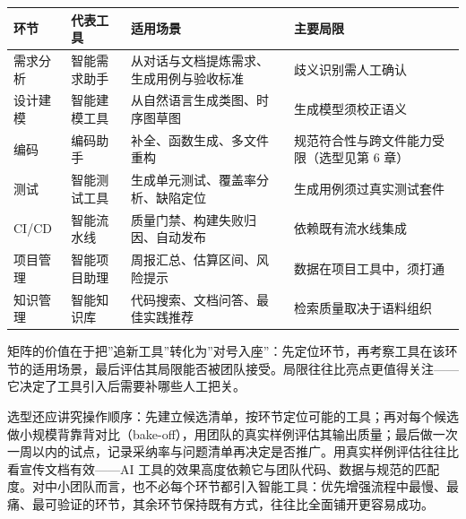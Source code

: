 \documentclass[
]{ctexbook}
\newcounter{none}
\begin{document}
{\def\LTcaptype{none} %
\begin{longtable}[]{@{}
  >{\raggedright\arraybackslash}p{}
  >{\raggedright\arraybackslash}p{}
  >{\raggedright\arraybackslash}p{}
  >{\raggedright\arraybackslash}p{}@{}}
\toprule\noalign{}
\begin{minipage}[b]{\linewidth}\raggedright
环节
\end{minipage} & \begin{minipage}[b]{\linewidth}\raggedright
代表工具
\end{minipage} & \begin{minipage}[b]{\linewidth}\raggedright
适用场景
\end{minipage} & \begin{minipage}[b]{\linewidth}\raggedright
主要局限
\end{minipage} \\
\midrule\noalign{}
\endhead
\bottomrule\noalign{}
\endlastfoot
需求分析 & 智能需求助手 & 从对话与文档提炼需求、生成用例与验收标准 &
歧义识别需人工确认 \\
设计建模 & 智能建模工具 & 从自然语言生成类图、时序图草图 &
生成模型须校正语义 \\
编码 & 编码助手 & 补全、函数生成、多文件重构 &
规范符合性与跨文件能力受限（选型见第 6 章） \\
测试 & 智能测试工具 & 生成单元测试、覆盖率分析、缺陷定位 &
生成用例须过真实测试套件 \\
CI/CD & 智能流水线 & 质量门禁、构建失败归因、自动发布 &
依赖既有流水线集成 \\
项目管理 & 智能项目助理 & 周报汇总、估算区间、风险提示 &
数据在项目工具中，须打通 \\
知识管理 & 智能知识库 & 代码搜索、文档问答、最佳实践推荐 &
检索质量取决于语料组织 \\
\end{longtable}
}

矩阵的价值在于把''追新工具''转化为''对号入座''：先定位环节，再考察工具在该环节的适用场景，最后评估其局限能否被团队接受。局限往往比亮点更值得关注------它决定了工具引入后需要补哪些人工把关。

选型还应讲究操作顺序：先建立候选清单，按环节定位可能的工具；再对每个候选做小规模背靠背对比（bake-off），用团队的真实样例评估其输出质量；最后做一次一周以内的试点，记录采纳率与问题清单再决定是否推广。用真实样例评估往往比看宣传文档有效------AI
工具的效果高度依赖它与团队代码、数据与规范的匹配度。对中小团队而言，也不必每个环节都引入智能工具：优先增强流程中最慢、最痛、最可验证的环节，其余环节保持既有方式，往往比全面铺开更容易成功。
\end{document}
